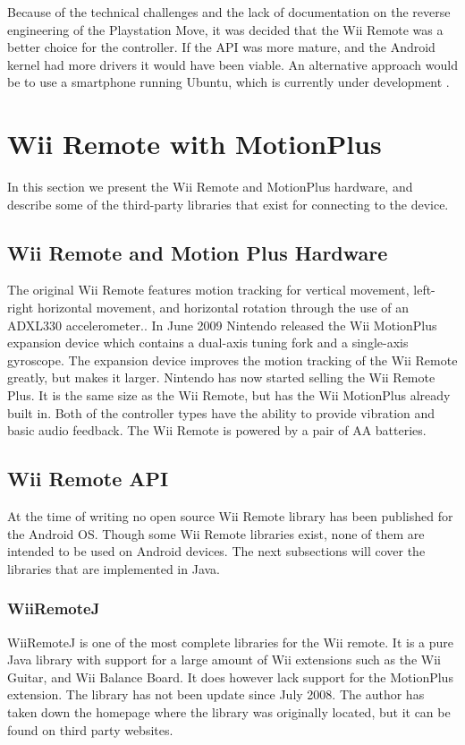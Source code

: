 Because of the technical challenges and the lack of documentation on the reverse engineering of the Playstation Move, it was decided that the Wii Remote was a better choice for the controller. If the API was more mature, and the Android kernel had more drivers it would have been viable. An alternative approach would be to use a smartphone running Ubuntu, which is currently under development \cite{ubuntuAndroid}.

\section{Wii Remote with MotionPlus}
In this section we present the Wii Remote and MotionPlus hardware, and describe some of the third-party libraries that exist for connecting to the device.

\subsection{Wii Remote and Motion Plus Hardware}
The original Wii Remote features motion tracking for vertical movement, left-right horizontal movement, and horizontal rotation through the use of an ADXL330 accelerometer.\cite{wiiAccelerometer}. In June 2009 Nintendo released the Wii MotionPlus expansion device which contains a dual-axis tuning fork and a single-axis gyroscope\cite{wiiMotionPlus}. The expansion device improves the motion tracking of the Wii Remote greatly, but makes it larger. Nintendo has now started selling the Wii Remote Plus. It is the same size as the Wii Remote, but has the Wii MotionPlus already built in. Both of the controller types have the ability to provide vibration and basic audio feedback. The Wii Remote is powered by a pair of AA batteries.

\subsection{Wii Remote API}
At the time of writing no open source Wii Remote library has been published for the Android OS. Though some Wii Remote libraries exist, none of them are intended to be used on Android devices. The next subsections will cover the libraries that are implemented in Java.

\subsubsection{WiiRemoteJ}
WiiRemoteJ is one of the most complete libraries for the Wii remote. It is a pure Java library with support for a large amount of Wii extensions such as the Wii Guitar, and Wii Balance Board. It does however lack support for the MotionPlus extension. The library has not been update since July 2008. The author has taken down the homepage where the library was originally located, but it can be found on third party websites. \cite{WiiRemoteJ}

